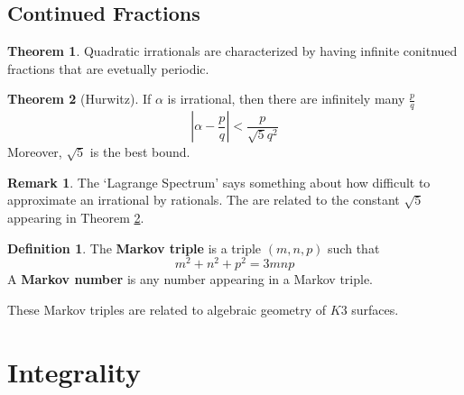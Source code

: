 \documentclass{article}
\theoremstyle{definition}
\newtheorem{theorem}{Theorem}[section]
\theoremstyle{definition}
\newtheorem{definition}{Definition}[theorem]
\theoremstyle{definition}
\newtheorem{remark}{Remark}[theorem]
\theoremstyle{definition}
\theoremstyle{definition}
\theoremstyle{definition}
\theoremstyle{definition}
\begin{document}
\subsection{Continued Fractions}


\begin{tcolorbox}[colback=red!5!white,colframe=red!30!white]
\begin{theorem}
    Quadratic irrationals are characterized by having infinite conitnued fractions that are evetually periodic. 
\end{theorem}
\end{tcolorbox}



\begin{tcolorbox}[colback=red!5!white,colframe=red!30!white]
\begin{theorem}[Hurwitz]
    \label{Hurwitz}
    If $\alpha $ is irrational, then there are infinitely many $\frac{p}{q}$
    \[|\alpha-\frac{p}{q}|<\frac{p}{\sqrt{5}q^2}\]
    Moreover, $\sqrt{5}$ is the best bound. 
\end{theorem}
\end{tcolorbox}


\begin{tcolorbox}[colback=green!5!white,colframe=green!30!white]
\begin{remark}
The `Lagrange Spectrum' says something about how difficult to approximate an irrational by rationals. The are related to the constant $\sqrt{5}$ appearing in Theorem \ref{Hurwitz}.
\end{remark}
\end{tcolorbox}













\begin{tcolorbox}[colback=purple!5!white,colframe=purple!75!black]
\begin{definition}
The \textbf{Markov triple} is a triple $(m,n,p)$
such that 
\[m^2+n^2+p^2=3mnp\]
A \textbf{Markov number} is any number appearing in a Markov triple. 
\end{definition}
\end{tcolorbox}
These Markov triples are related to algebraic geometry of $K3$ surfaces.  


\section{Integrality}
\end{document}
